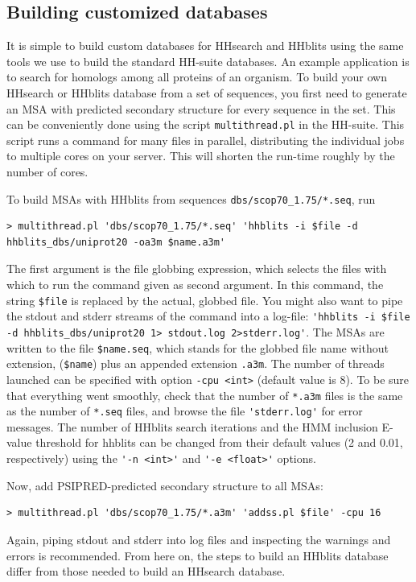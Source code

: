 \documentclass[11pt,a4paper]{article}
\begin{document}
\subsection{Building customized databases}

It is simple to build custom databases for HHsearch and HHblits using the same tools we use to build the standard HH-suite databases. An example application is to search for homologs among all proteins of an organism. To build your own HHsearch or HHblits database from a set of sequences, you first need to generate an MSA with predicted secondary structure for every sequence in the set. This can be conveniently done using the script \verb`multithread.pl` in the HH-suite. This script runs a command for many files in parallel, distributing the individual jobs to multiple cores on your server. This will shorten the run-time roughly by the number of cores. 

To build MSAs with HHblits from sequences \verb`dbs/scop70_1.75/*.seq`, run
\begin{verbatim}
> multithread.pl 'dbs/scop70_1.75/*.seq' 'hhblits -i $file -d hhblits_dbs/uniprot20 -oa3m $name.a3m' 
\end{verbatim}
The first argument is the file globbing expression, which selects the files with which to run the command given as second argument. In this command, the string \verb`$file` is replaced by the actual, globbed file. You might also want to pipe the stdout and stderr streams of the command into a log-file: \verb`'hhblits -i $file -d hhblits_dbs/uniprot20 1> stdout.log 2>stderr.log'`. The MSAs are written to the file \verb`$name.seq`, which stands for the globbed file name without extension, (\verb`$name`) plus an appended extension \verb`.a3m`. The number of threads launched can be specified with option \verb`-cpu <int>` (default value is 8). To be sure that everything went smoothly, check that the number of \verb`*.a3m` files is the same as the number of \verb`*.seq` files, and browse the file \verb`'stderr.log'` for error messages. The number of HHblits search iterations and the HMM inclusion E-value threshold for hhblits can be changed from their default values (2 and 0.01, respectively) using the \verb`'-n <int>'` and \verb`'-e <float>'` options. 

Now, add PSIPRED-predicted secondary structure to all MSAs:
\begin{verbatim}
> multithread.pl 'dbs/scop70_1.75/*.a3m' 'addss.pl $file' -cpu 16 
\end{verbatim}
Again, piping stdout and stderr into log files and inspecting the warnings and errors is recommended. From here on, the steps to build an HHblits database differ from those needed to build an HHsearch database.
\end{document}
